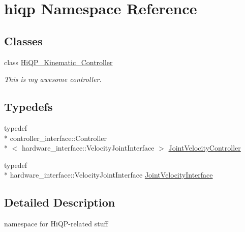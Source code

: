 \hypertarget{namespacehiqp}{\section{hiqp Namespace Reference}
\label{namespacehiqp}
}
\subsection*{Classes}
\begin{DoxyCompactItemize}
\item 
class \hyperlink{classhiqp_1_1HiQP__Kinematic__Controller}{Hi\-Q\-P\-\_\-\-Kinematic\-\_\-\-Controller}
\begin{DoxyCompactList}\small\item\em This is my awesome controller. \end{DoxyCompactList}\end{DoxyCompactItemize}
\subsection*{Typedefs}
\begin{DoxyCompactItemize}
\item 
typedef \\*
controller\-\_\-interface\-::\-Controller\\*
$<$ hardware\-\_\-interface\-::\-Velocity\-Joint\-Interface $>$ \hyperlink{namespacehiqp_a7b250295f6797153486ce8ab085bd450}{Joint\-Velocity\-Controller}
\item 
typedef \\*
hardware\-\_\-interface\-::\-Velocity\-Joint\-Interface \hyperlink{namespacehiqp_ac536ca3b4ba33489281fa5bec490799c}{Joint\-Velocity\-Interface}
\end{DoxyCompactItemize}


\subsection{Detailed Description}
namespace for Hi\-Q\-P-\/related stuff 

